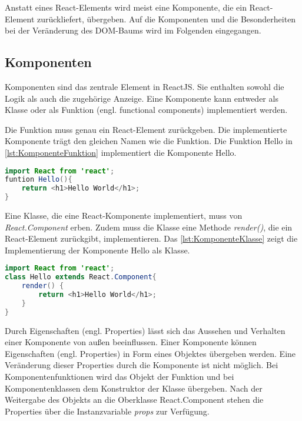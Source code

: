Anstatt eines React-Elements wird meist eine Komponente, die ein React-Element zurückliefert, übergeben. Auf die Komponenten und die Besonderheiten bei der Veränderung des DOM-Baums wird im Folgenden eingegangen.

\subsection{Komponenten}
Komponenten sind das zentrale Element in ReactJS. Sie enthalten sowohl die Logik als auch die zugehörige Anzeige. Eine Komponente kann entweder als Klasse oder als Funktion (engl. functional components) implementiert werden.  %

Die Funktion muss genau ein React-Element zurückgeben. Die implementierte Komponente trägt den gleichen Namen wie die Funktion. Die Funktion Hello in \autoref{lst:KomponenteFunktion} implementiert die Komponente Hello.

\begin{lstlisting}[caption=Beispiel einer Komponente als Funktion, label=lst:KomponenteFunktion, language=Java]
import React from 'react';
funtion Hello(){
	return <h1>Hello World</h1>;
}
\end{lstlisting}

Eine Klasse, die eine React-Komponente implementiert, muss von \textit{React.Component} erben. Zudem muss die Klasse eine Methode \textit{render()}, die ein React-Element zurückgibt, implementieren. Das \autoref{lst:KomponenteKlasse} zeigt die Implementierung der Komponente Hello als Klasse.\autocite[vgl.][80\psqq]{Zeigermann.2016}

\begin{lstlisting}[caption=Beispiel einer Komponente als Klasse, label=lst:KomponenteKlasse, language=Java]
import React from 'react';
class Hello extends React.Component{
	render() {
		return <h1>Hello World</h1>;
	}
}
\end{lstlisting}

Durch Eigenschaften (engl. Properties) lässt sich das Aussehen und Verhalten einer Komponente von außen beeinflussen. Einer Komponente können Eigenschaften (engl. Properties) in Form eines Objektes übergeben werden. Eine Veränderung dieser Properties durch die Komponente ist nicht möglich. Bei Komponentenfunktionen wird das Objekt der Funktion und bei Komponentenklassen dem Konstruktor der Klasse übergeben. Nach der Weitergabe des Objekts an die Oberklasse React.Component stehen die Properties über die Instanzvariable \textit{props} zur Verfügung. \autocites[vgl.][24\psq,83-88]{Zeigermann.2016}[vgl.][12-17]{Stefanov.2017}

